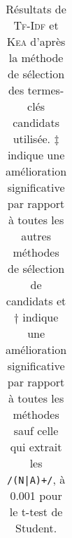 \begin{table}[h!]
{\begin{tabular}{r@{~}|c@{~~}c@{~~}c@{~}|@{~}c@{~~}c@{~~}c@{~}|@{~}c@{~~}c@{~~}c@{~}|@{~}c@{~~}c@{~~}c@{~}|@{~}c@{~~}c@{~~}c@{~}|@{~}c@{~~}c@{~~}c@{~}|@{~}c@{~~}c@{~~}c@{~}|@{~}c@{~~}c@{~~}c@{~}}
              \bottomrule
            \end{tabular}
          }
          \caption[
            Résultats de \textsc{Tf-Idf} et \textsc{Kea} selon la
            méthode de sélection des termes-clés candidats utilisée
          ]{
            Résultats de \textsc{Tf-Idf} et \textsc{Kea} d'après la
            méthode de sélection des termes-clés candidats utilisée.
            $\ddagger$ indique une amélioration significative par rapport à
            toutes les autres méthodes de sélection de candidats et $\dagger$
            indique une amélioration significative par rapport à toutes les
            méthodes sauf celle qui extrait les \texttt{/(N|A)+/}, à 0.001 pour
            le t-test de Student.
           \label{tab:keyphrase_extraction_results_with_filtering_termith}}
        \end{table}
